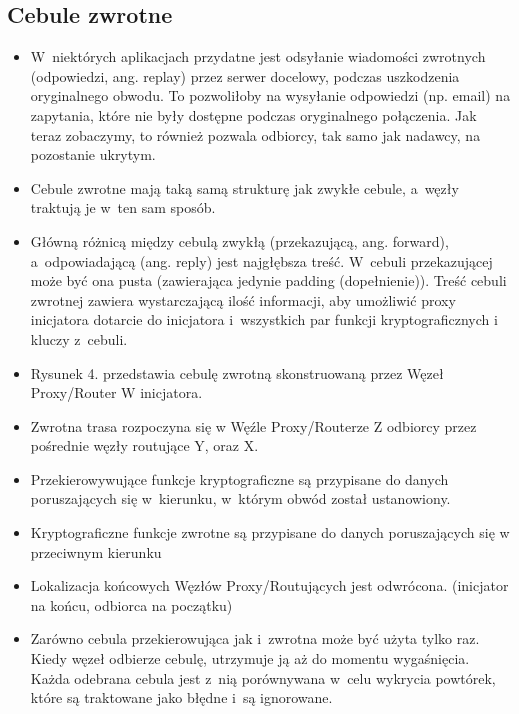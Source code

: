         \subsection{Cebule zwrotne}
        \begin{itemize}
            \item W~niektórych aplikacjach przydatne jest odsyłanie wiadomości zwrotnych (odpowiedzi, ang. replay) przez serwer docelowy, podczas uszkodzenia oryginalnego obwodu. To pozwoliłoby na wysyłanie odpowiedzi (np. email) na zapytania, które nie były dostępne podczas oryginalnego połączenia. Jak teraz zobaczymy, to również pozwala odbiorcy, tak samo jak nadawcy, na pozostanie ukrytym.
            \item Cebule zwrotne mają taką samą strukturę jak zwykłe cebule, a~węzły traktują je w~ten sam sposób.
            \item Główną różnicą między cebulą zwykłą (przekazującą, ang. forward), a~odpowiadającą (ang. reply) jest najgłębsza treść. W~cebuli przekazującej może być ona pusta (zawierająca jedynie padding (dopełnienie)). Treść cebuli zwrotnej zawiera wystarczającą ilość informacji, aby umożliwić proxy inicjatora dotarcie do inicjatora i~wszystkich par funkcji kryptograficznych i kluczy z~cebuli.
            \item Rysunek 4. przedstawia cebulę zwrotną skonstruowaną przez Węzeł Proxy/Router W inicjatora.
            \item Zwrotna trasa rozpoczyna się w Węźle Proxy/Routerze Z odbiorcy przez pośrednie węzły routujące Y, oraz X.
            \item Przekierowywujące funkcje kryptograficzne są przypisane do danych poruszających się w~kierunku, w~którym obwód został ustanowiony.
            \item Kryptograficzne funkcje zwrotne są przypisane do danych poruszających się w przeciwnym kierunku
            \item Lokalizacja końcowych Węzłów Proxy/Routujących jest odwrócona. (inicjator na końcu, odbiorca na początku)
            \item Zarówno cebula przekierowująca jak i~zwrotna może być użyta tylko raz. Kiedy węzeł odbierze cebulę, utrzymuje ją aż do momentu wygaśnięcia. Każda odebrana cebula jest z~nią porównywana w~celu wykrycia powtórek, które są traktowane jako błędne i~są ignorowane. 
        \end{itemize}
        
